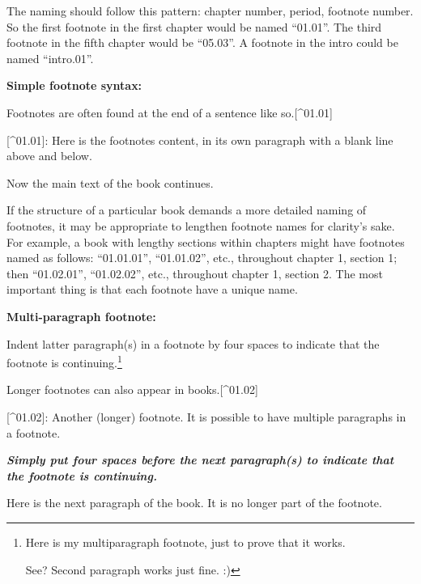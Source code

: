 \documentclass[
]{book}
\newenvironment{Shaded}{\begin{snugshade}}{\end{snugshade}}
\newcommand{\InformationTok}[1]{\textcolor[rgb]{0.56,0.35,0.01}{\textbf{\textit{#1}}}}
\newcommand{\NormalTok}[1]{#1}
\newcommand{\OtherTok}[1]{\textcolor[rgb]{0.56,0.35,0.01}{#1}}
\begin{document}
The naming should follow this pattern: chapter number, period, footnote number. So the first footnote in the first chapter would be named ``01.01''. The third footnote in the fifth chapter would be ``05.03''. A footnote in the intro could be named ``intro.01''.

\textbf{Simple footnote syntax:}

\begin{Shaded}
\begin{Highlighting}[]
\NormalTok{Footnotes are often found at the end of a sentence like so.}\OtherTok{[\^{}01.01]}

\OtherTok{[\^{}01.01]: }\NormalTok{Here is the footnote\textquotesingle{}s content, in its own paragraph with a blank line above and below.}

\NormalTok{Now the main text of the book continues.}
\end{Highlighting}
\end{Shaded}

If the structure of a particular book demands a more detailed naming of footnotes, it may be appropriate to lengthen footnote names for clarity's sake. For example, a book with lengthy sections within chapters might have footnotes named as follows: ``01.01.01'', ``01.01.02'', etc., throughout chapter 1, section 1; then ``01.02.01'', ``01.02.02'', etc., throughout chapter 1, section 2. The most important thing is that each footnote have a unique name.

\textbf{Multi-paragraph footnote:}

Indent latter paragraph(s) in a footnote by four spaces to indicate that the footnote is continuing.\footnote{Here is my multiparagraph footnote, just to prove that it works.

  See? Second paragraph works just fine. :)}

\begin{Shaded}
\begin{Highlighting}[]
\NormalTok{Longer footnotes can also appear in books.}\OtherTok{[\^{}01.02]}

\OtherTok{[\^{}01.02]: }\NormalTok{Another (longer) footnote. It is possible to have multiple paragraphs in a footnote.}

\InformationTok{    Simply put four spaces before the next paragraph(s) to indicate that the footnote is continuing.}
  
\NormalTok{Here is the next paragraph of the book. It is no longer part of the footnote.}
\end{Highlighting}
\end{Shaded}
\end{document}
